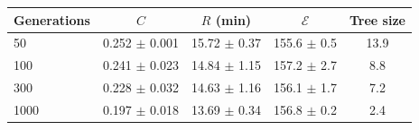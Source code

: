 \begin{tabular}{lcccc}\toprule
Generations & $C$ & $R$ (min) & $\mathcal{E}$ & Tree size\\\midrule
50 & 0.252 $\pm$ 0.001 & 15.72 $\pm$ 0.37 & 155.6 $\pm$ 0.5 & 13.9\\
100 & 0.241 $\pm$ 0.023 & 14.84 $\pm$ 1.15 & 157.2 $\pm$ 2.7 & 8.8\\
300 & 0.228 $\pm$ 0.032 & 14.63 $\pm$ 1.16 & 156.1 $\pm$ 1.7 & 7.2\\
1000 & 0.197 $\pm$ 0.018 & 13.69 $\pm$ 0.34 & 156.8 $\pm$ 0.2 & 2.4\\
\bottomrule
\end{tabular}